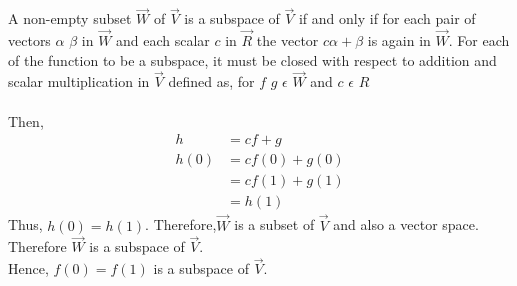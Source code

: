  A non-empty subset $\vec{W}$ of $\vec{V}$ is a subspace of $\vec{V}$ if and only if for each pair of vectors ${\alpha}$ ${\beta}$ in $\vec{W}$ and each scalar  $c$ in $\vec{R}$ the vector ${{c\alpha}+{\beta}}$ is again in  $\vec{W}$.
For each of the function to be a subspace, it must be closed with respect to addition and scalar multiplication in $\vec{V}$ defined as, for $f$ $g$ $\epsilon$ $\vec{W}$ and $c$ $\epsilon$ $R$
\\ \\ 
Then,
    \begin{align}
    h&=cf+g\\
    h(0)&=cf(0)+g(0)\\
    &=cf(1)+g(1)\\
    &=h(1)
    \end{align}
                  Thus, $h(0)=h(1)$. Therefore,$\vec{W}$ is a subset of $\vec{V}$ and also a vector space. Therefore $\vec{W}$ is a subspace of $\vec{V}$.\\
    Hence, $f(0) = f(1)$ is a subspace of $\vec{V}$.
                  
